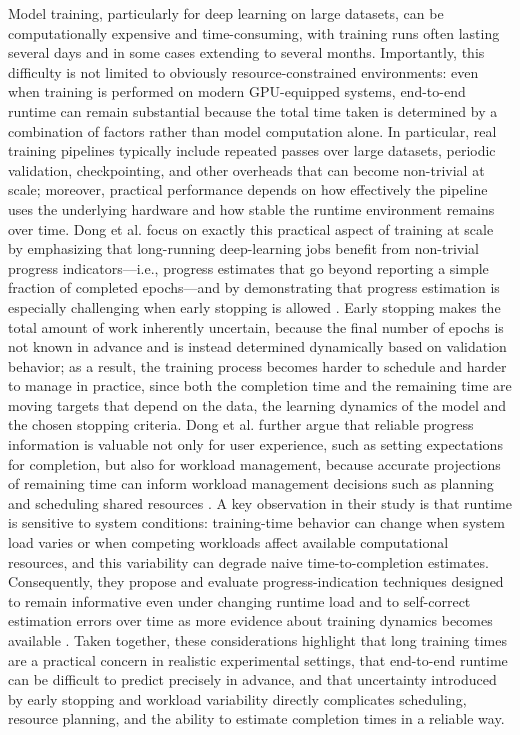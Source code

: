 \documentclass[12pt,a4paper]{article}
\begin{document}
Model training, particularly for deep learning on large datasets, can be computationally expensive and time-consuming, with training runs often lasting several days and in some cases extending to several months. Importantly, this difficulty is not limited to obviously resource-constrained environments: even when training is performed on modern GPU-equipped systems, end-to-end runtime can remain substantial because the total time taken is determined by a combination of factors rather than model computation alone. In particular, real training pipelines typically include repeated passes over large datasets, periodic validation, checkpointing, and other overheads that can become non-trivial at scale; moreover, practical performance depends on how effectively the pipeline uses the underlying hardware and how stable the runtime environment remains over time. Dong et al. focus on exactly this practical aspect of training at scale by emphasizing that long-running deep-learning jobs benefit from non-trivial progress indicators—i.e., progress estimates that go beyond reporting a simple fraction of completed epochs—and by demonstrating that progress estimation is especially challenging when early stopping is allowed \cite{dong2020}. Early stopping makes the total amount of work inherently uncertain, because the final number of epochs is not known in advance and is instead determined dynamically based on validation behavior; as a result, the training process becomes harder to schedule and harder to manage in practice, since both the completion time and the remaining time are moving targets that depend on the data, the learning dynamics of the model and the chosen stopping criteria. Dong et al. further argue that reliable progress information is valuable not only for user experience, such as setting expectations for completion, but also for workload management, because accurate projections of remaining time can inform workload management decisions such as planning and scheduling shared resources \cite{dong2020}. A key observation in their study is that runtime is sensitive to system conditions: training-time behavior can change when system load varies or when competing workloads affect available computational resources, and this variability can degrade naive time-to-completion estimates. Consequently, they propose and evaluate progress-indication techniques designed to remain informative even under changing runtime load and to self-correct estimation errors over time as more evidence about training dynamics becomes available \cite{dong2020}. Taken together, these considerations highlight that long training times are a practical concern in realistic experimental settings, that end-to-end runtime can be difficult to predict precisely in advance, and that uncertainty introduced by early stopping and workload variability directly complicates scheduling, resource planning, and the ability to estimate completion times in a reliable way.
\end{document}
